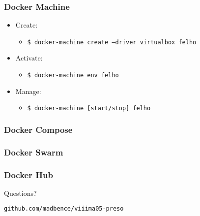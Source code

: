 \documentclass[xetex,mathserif,serif]{beamer}
\begin{document}
  \begin{frame}
    \frametitle{Docker Machine}
    \begin{itemize}
      \item Create:
        \begin{itemize}
          \item \texttt{\$ docker-machine create --driver virtualbox felho}
        \end{itemize}
      \item Activate:
        \begin{itemize}
          \item \texttt{\$ docker-machine env felho}
        \end{itemize}
      \item Manage:
        \begin{itemize}
          \item \texttt{\$ docker-machine [start/stop] felho}
        \end{itemize}
    \end{itemize}
  \end{frame}
  \begin{frame}
    \frametitle{Docker Compose}
  \end{frame}
  \begin{frame}
    \frametitle{Docker Swarm}
  \end{frame}
  \begin{frame}
    \frametitle{Docker Hub}
  \end{frame}
  \begin{frame}[c,plain]
    \begin{center}
      {\Huge Questions?}

      \vspace{1cm}

      \texttt{github.com/madbence/viiima05-preso}
    \end{center}
  \end{frame}
\end{document}
